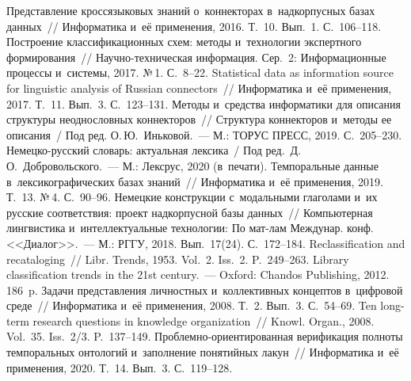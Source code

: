 \begin{multicols}{2}
{{\begin{thebibliography}{99}
 Представление 
кроссязыковых знаний о~коннекторах в~надкорпусных базах данных~// Информатика 
и~её применения, 2016. Т.~10. Вып.~1.  
С.~106--118.
 По\-стро\-ение классификационных схем: 
методы и~технологии экспертного формирования~// На\-уч\-но-тех\-ни\-че\-ская 
информация. Сер.~2: Информационные процессы и~сис\-те\-мы, 2017. №\,1. С.~8--22.
 Statistical data as information source for linguistic analysis of 
Russian connectors~// Информатика и~её применения, 2017. Т.~11. Вып.~3. С.~123--131.
 Методы и~средства информатики для 
описания структуры неоднословных коннекторов~// Структура коннекторов и~методы ее 
описания~/ Под ред. О.\,Ю.~Иньковой.~--- М.: ТОРУС ПРЕСС, 2019. С.~205--230.
Немецко-русский словарь: актуальная лексика~/ Под ред.\ Д.\,О.~Добровольского.~--- М.: 
Лексрус, 2020 (в~печати).
 Темпоральные данные 
в~лексикографических базах знаний~// Информатика и~её применения, 2019. Т.~13. №\,4. 
С.~90--96.
 Немецкие конструкции с~модальными 
глаголами и~их русские соответствия: проект надкорпусной базы данных~// 
Компьютерная лингвистика и~интеллектуальные \mbox{технологии:} По мат-лам Междунар. 
конф. <<Диалог>>.~--- М.: РГГУ, 2018. Вып.~17(24). С.~172--184.
 Reclassification and recataloging~// Libr. Trends, 1953. 
Vol.~2. Iss.~2.  
P.~249--263.
 Library classification trends in the 21st century.~--- Oxford: Chandos 
Publishing, 2012. 186~p.
 Задачи представления личностных 
и~коллективных концептов в~цифровой среде~// Информатика и~её применения, 2008. 
Т.~2. Вып.~3. С.~54--69.
 Ten long-term research questions in knowledge organization~// Knowl. 
Organ., 2008. Vol.~35. Iss.~2/3. P.~137--149.
 Проб\-лем\-но-ори\-ен\-ти\-ро\-ван\-ная верификация полноты 
темпоральных онтологий и~заполнение понятийных лакун~// Информатика и~её 
применения, 2020. Т.~14. Вып.~3. С.~119--128.
\end{thebibliography}

 }
 }

\end{multicols}

